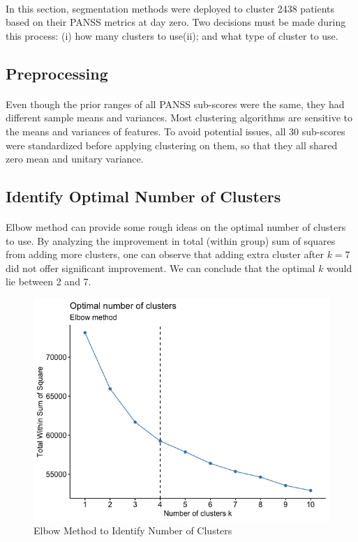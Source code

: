 \documentclass[11pt]{article}
\begin{document}
	\paragraph{} In this section, segmentation methods were deployed to cluster 2438 patients based on their PANSS metrics at day zero. Two decisions must be made during this process: (i) how many clusters to use(ii); and what type of cluster to use.
	\subsection{Preprocessing}
	\paragraph{} Even though the prior ranges of all PANSS sub-scores were the same, they had different sample means and variances. Most clustering algorithms are sensitive to the means and variances of features. To avoid potential issues, all 30 sub-scores were standardized before applying clustering on them, so that they all shared zero mean and unitary variance.

	\subsection{Identify Optimal Number of Clusters}
	\paragraph{} Elbow method can provide some rough ideas on the optimal number of clusters to use. By analyzing the improvement in total (within group) sum of squares from adding more clusters, one can observe that adding extra cluster after $k=7$ did not offer significant improvement. We can conclude that the optimal $k$ would lie between 2 and 7.
	
	\begin{figure}[H]
		\centering
		\includegraphics[width=0.7\linewidth]{figures/Elbow_method.png}
		\caption{Elbow Method to Identify Number of Clusters}
	\end{figure}
	
\end{document}
